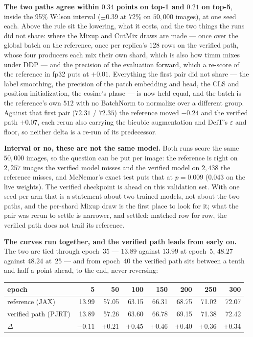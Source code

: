 \medskip\noindent\textbf{The two paths agree within $0.34$ points on top-1 and
$0.21$ on top-5}, inside the 95\% Wilson interval ($\pm0.39$ at
$72\%$ on $50{,}000$ images), at one seed each. Above the rule sit the
lowering, what it costs, and the two things the runs did not share: where
the Mixup and CutMix draws are made --- once over the global batch on the
reference, once per replica's $128$ rows on the verified path, whose four
producers each mix their own shard, which is also how timm mixes under
DDP --- and the precision of the evaluation forward, which a re-score of
the reference in fp32 puts at $+0.01$. Everything the first pair did not
share --- the label smoothing, the precision of the patch embedding and
head, the CLS and position initialization, the cosine's phase --- is now
held equal, and the batch is the reference's own $512$ with no BatchNorm
to normalize over a different group. Against that first pair ($72.31$ /
$72.35$) the reference moved $-0.24$ and the verified path $+0.07$, each
rerun also carrying the bicubic augmentation and DeiT's $\varepsilon$ and
floor, so neither delta is a re-run of its predecessor.

\medskip\noindent\textbf{Interval or no, these are not the same model.}
Both runs score the same $50{,}000$ images, so the question can be put
per image: the reference is right on $2{,}257$ images the verified model
misses and the verified model on $2{,}438$ the reference misses, and
McNemar's exact test puts that at $p = 0.009$ ($0.043$ on the live
weights). The verified checkpoint is ahead on this validation set. With
one seed per arm that is a statement about two trained models, not about
the two paths, and the per-shard Mixup draw is the first place to look
for it; what the pair was rerun to settle is narrower, and settled:
matched row for row, the verified path does not trail its reference.

\medskip\noindent\textbf{The curves run together, and the verified path
leads from early on.} The two are tied through epoch~35 --- $13.89$
against $13.99$ at epoch~5, $48.27$ against $48.24$ at~25 --- and from
epoch~40 the verified path sits between a tenth and half a point ahead,
to the end, never reversing:

\begin{center}
\begin{tabular}{@{}l r r r r r r r@{}}
\hline
epoch & 5 & 50 & 100 & 150 & 200 & 250 & 300 \\
\hline
reference (JAX)       & 13.99 & 57.05 & 63.15 & 66.31 & 68.75 & 71.02 & 72.07 \\
verified path (PJRT)  & 13.89 & 57.26 & 63.60 & 66.78 & 69.15 & 71.38 & 72.42 \\
$\Delta$              & $-0.11$ & $+0.21$ & $+0.45$ & $+0.46$ & $+0.40$ & $+0.36$ & $+0.34$ \\
\hline
\end{tabular}
\end{center}

